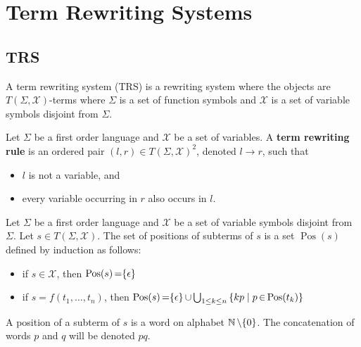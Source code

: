 \section{Term Rewriting Systems}

\subsection{TRS}
A term rewriting system (TRS) is a rewriting system where the objects are $T(\Sigma,\mathcal{X})$-terms where $\Sigma$ is a set of function symbols and $\mathcal{X}$ is a set of variable symbols disjoint from $\Sigma$.
  
\begin{definition}
    Let $\Sigma$ be a first order language and $\mathcal{X}$ be a set of variables. A \textbf{term rewriting rule} is an ordered pair $(l,r) \mathop{\in} T(\Sigma, \mathcal{X})^2$, denoted $l \mathop{\to} r$, such that
    \begin{itemize}
      \item $l$ is not a variable, and
      \item every variable occurring in $r$ also occurs in $l$.
    \end{itemize}
  \end{definition}
  
  \begin{definition}
    Let $\Sigma$ be a first order language and $\mathcal{X}$ be a set of variable symbols disjoint from $\Sigma$. Let $s \mathop{\in} T(\Sigma, \mathcal{X})$.
    The set of positions of subterms of $s$ is a set $\operatorname{Pos}(s)$ defined by induction as follows:
    \begin{itemize}
      \item if $s \mathop{\in} \mathcal{X}$, then $\operatorname{Pos}(s) \mathop{=} \{\epsilon\}$
      \item if $s \mathop{=} f(t_1,\hdots,t_n)$, 
            then $\operatorname{Pos}(s) \mathop{=} \{\epsilon\} \mathop{\cup} \bigcup_{1 \leq k \leq n} \left \{kp\mid p \mathop{\in} \operatorname{Pos}(t_k) \right \}$
  \end{itemize}
  A position of a subterm of $s$ is a word on alphabet $\mathbb{N}\mathop{\setminus}\{0\}$. 
    The concatenation of words $p$ and $q$ will be denoted $pq$.
  \end{definition}

